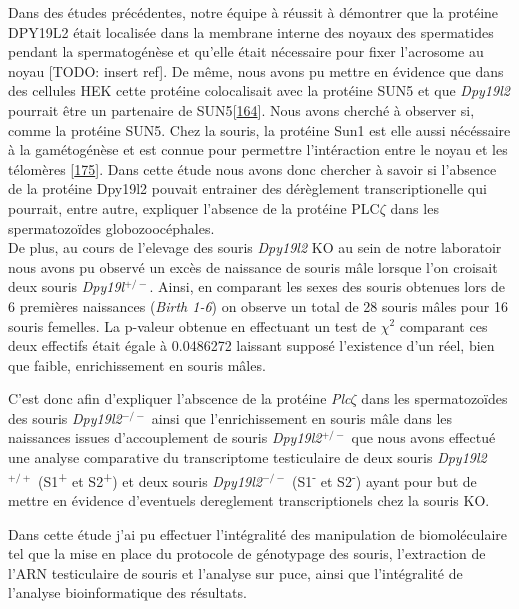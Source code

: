 \documentclass[12pt,twoside]{reedthesis}
\theoremstyle{definition}
\theoremstyle{definition}
\theoremstyle{remark}
\begin{document}
  Dans des études précédentes, notre équipe à réussit à démontrer que la
  protéine DPY19L2 était localisée dans la membrane interne des noyaux des
  spermatides pendant la spermatogénèse et qu'elle était nécessaire pour
  fixer l'acrosome au noyau {[}TODO: insert ref{]}. De même, nous avons pu
  mettre en évidence que dans des cellules HEK cette protéine colocalisait
  avec la protéine SUN5 et que \emph{Dpy19l2} pourrait être un partenaire
  de SUN5{[}\protect\hyperlink{ref-Pierre2012}{164}{]}. Nous avons cherché
  à observer si, comme la protéine SUN5. Chez la souris, la protéine Sun1
  est elle aussi nécéssaire à la gamétogénèse et est connue pour permettre
  l'intéraction entre le noyau et les télomères
  {[}\protect\hyperlink{ref-Ding2007}{175}{]}. Dans cette étude nous avons
  donc chercher à savoir si l'absence de la protéine Dpy19l2 pouvait
  entrainer des dérèglement transcriptionelle qui pourrait, entre autre,
  expliquer l'absence de la protéine PLC\(\zeta\) dans les spermatozoïdes
  globozoocéphales.\\
  De plus, au cours de l'elevage des souris \emph{Dpy19l2} KO au sein de
  notre laboratoir nous avons pu observé un excès de naissance de souris
  mâle lorsque l'on croisait deux souris \emph{Dpy19l}\(^{+/-}\). Ainsi,
  en comparant les sexes des souris obtenues lors de 6 premières
  naissances (\emph{Birth 1-6}) on observe un total de 28 souris mâles
  pour 16 souris femelles. La p-valeur obtenue en effectuant un test de
  \(\chi^2\) comparant ces deux effectifs était égale à 0.0486272 laissant
  supposé l'existence d'un réel, bien que faible, enrichissement en souris
  mâles.
  
  C'est donc afin d'expliquer l'abscence de la protéine
  \emph{Plc}\(\zeta\) dans les spermatozoïdes des souris
  \emph{Dpy19l2}\(^{-/-}\) ainsi que l'enrichissement en souris mâle dans
  les naissances issues d'accouplement de souris \emph{Dpy19l2}\(^{+/-}\)
  que nous avons effectué une analyse comparative du transcriptome
  testiculaire de deux souris \emph{Dpy19l2}\(^{+/+}\)
  (S1\textsuperscript{+} et S2\textsuperscript{+}) et deux souris
  \emph{Dpy19l2}\(^{-/-}\) (S1\textsuperscript{-} et
  S2\textsuperscript{-}) ayant pour but de mettre en évidence d'eventuels
  dereglement transcriptionels chez la souris KO.
  
  Dans cette étude j'ai pu effectuer l'intégralité des manipulation de
  biomoléculaire tel que la mise en place du protocole de génotypage des
  souris, l'extraction de l'ARN testiculaire de souris et l'analyse sur
  puce, ainsi que l'intégralité de l'analyse bioinformatique des
  résultats.
  
\end{document}
